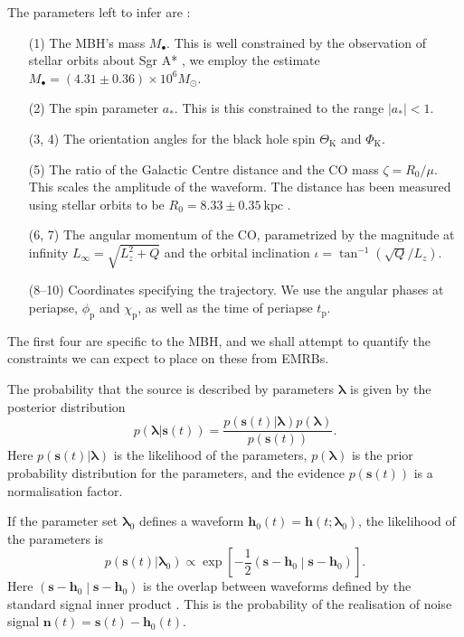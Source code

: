 \documentclass[useAMS,usedcolumn,usegraphicx,usenatbib]{mn2e}
\newcommand{\recip}[1]{\ensuremath{\dfrac{1}{#1}}}
\newcommand{\innerprod}[2]{\ensuremath{\left({#1}\middle|{#2}\right)}}
\begin{document}
The parameters left to infer are \citep{Berry2013}:
\begin{enumerate}
\item[(1)] The MBH's mass $M_\bullet$. This is well constrained by the observation of stellar orbits about Sgr A* \citep{Ghez2008, Gillessen2009}, we employ the estimate $M_\bullet = (4.31 \pm 0.36) \times 10^6 M_\odot$.
\item[(2)] The spin parameter $a_\ast$. This is this constrained to the range $|a_\ast| < 1$.
\item[(3, 4)] The orientation angles for the black hole spin $\Theta_\mathrm{K}$ and $\Phi_\mathrm{K}$.
\item[(5)] The ratio of the Galactic Centre distance and the CO mass $\zeta = R_0/\mu$. This scales the amplitude of the waveform. The distance has been measured using stellar orbits to be $R_0 = 8.33 \pm 0.35~\mathrm{kpc}$ \citep{Gillessen2009}.
\item[(6, 7)] The angular momentum of the CO, parametrized by the magnitude at infinity $L_\infty = \sqrt{L_z^2 + Q}$ and the orbital inclination $\iota = \tan^{-1}(\sqrt{Q}/L_z)$.
\item[(8--10)] Coordinates specifying the trajectory. We use the angular phases at periapse, $\phi_\mathrm{p}$ and $\chi_\mathrm{p}$, as well as the time of periapse $t_\mathrm{p}$.
\end{enumerate}
The first four are specific to the MBH, and we shall attempt to quantify the constraints we can expect to place on these from EMRBs.

The probability that the source is described by parameters $\boldsymbol{\lambda}$ is given by the posterior distribution
\begin{equation}
p(\boldsymbol{\lambda}|\boldsymbol{s}(t)) = \frac{p(\boldsymbol{s}(t)|\boldsymbol{\lambda})p(\boldsymbol{\lambda})}{p(\boldsymbol{s}(t))}.
\end{equation}
Here $p(\boldsymbol{s}(t)|\boldsymbol{\lambda})$ is the likelihood of the parameters, $p(\boldsymbol{\lambda})$ is the prior probability distribution for the parameters, and the evidence $p(\boldsymbol{s}(t))$ is a normalisation factor.

If the parameter set $\boldsymbol{\lambda}_0$ defines a waveform $\boldsymbol{h}_0(t) = \boldsymbol{h}(t; \boldsymbol{\lambda}_0)$, the likelihood of the parameters is
\begin{equation}
p(\boldsymbol{s}(t)|\boldsymbol{\lambda}_0) \propto \exp\left[-\recip{2}\innerprod{\boldsymbol{s}-\boldsymbol{h}_0}{\boldsymbol{s}-\boldsymbol{h}_0}\right].
\label{eq:likelihood}
\end{equation}
Here $\innerprod{\boldsymbol{s}-\boldsymbol{h}_0}{\boldsymbol{s}-\boldsymbol{h}_0}$ is the overlap between waveforms defined by the standard signal inner product \citep{Cutler1994}. This is the probability of the realisation of noise signal $\boldsymbol{n}(t) = \boldsymbol{s}(t) - \boldsymbol{h}_0(t)$.
\end{document}
